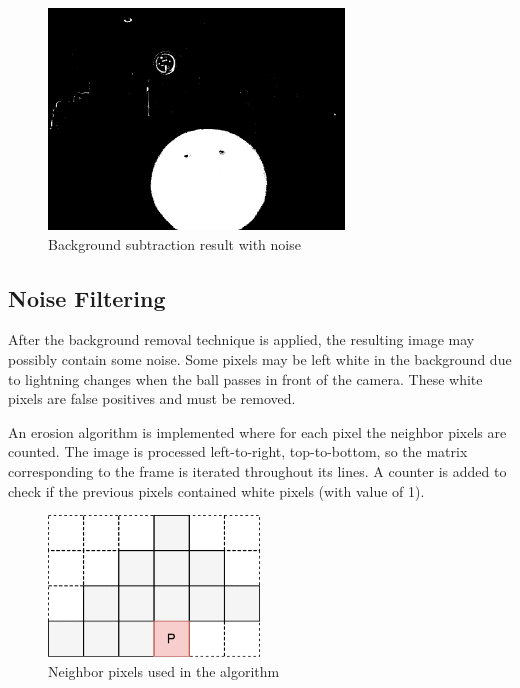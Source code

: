 \begin{figure}[htp]
	
	\centering
	\includegraphics[width=0.7\textwidth]{capcalib/imgs/noise.png}
	
	\caption{Background subtraction result with noise}
	\label{fig:ballnoise}
	
\end{figure}

\subsection{Noise Filtering}

After the background removal technique is applied, the resulting image may possibly contain some noise. Some pixels may be left white in the background due to lightning changes when the ball passes in front of the camera. These white pixels are false positives and must be removed.

An erosion algorithm is implemented where for each pixel the neighbor pixels are counted. The image is processed left-to-right, top-to-bottom, so the matrix corresponding to the frame is iterated throughout its lines. A counter is added to check if the previous pixels contained white pixels (with value of 1). 

\begin{figure}[htp]
	
	\centering
	\includegraphics[width=0.5\textwidth]{capcalib/imgs/neighpixel.pdf}
	
	\caption{Neighbor pixels used in the algorithm}
	\label{fig:neigh_cnt}
	
\end{figure}


